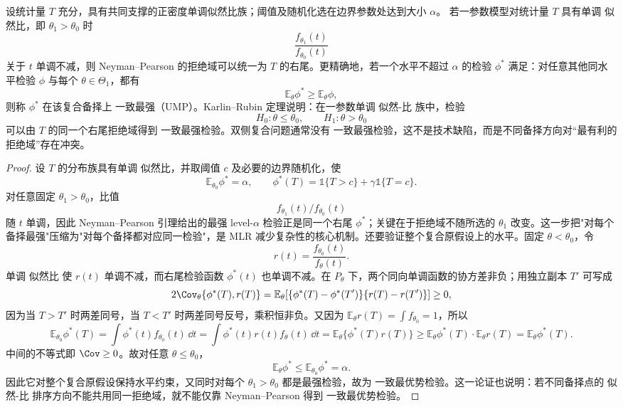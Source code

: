 \begin{theorem}[单调似然比与一致最强检验]
设统计量 $T$ 充分，具有共同支撑的正密度单调似然比族；阈值及随机化选在边界参数处达到大小 $\alpha$。
若一参数模型对统计量 $T$ 具有单调 似然比，即 $\theta_1>\theta_0$ 时
\[
 \frac{f_{\theta_1}(t)}{f_{\theta_0}(t)}
\]
关于 $t$ 单调不减，则 Neyman--Pearson 的拒绝域可以统一为 $T$ 的右尾。更精确地，若一个水平不超过 $\alpha$ 的检验 $\phi^*$ 满足：对任意其他同水平检验 $\phi$ 与每个 $\theta\in\Theta_1$，都有
\[
 \mathbb E_\theta\phi^*\ge\mathbb E_\theta\phi,
\]
则称 $\phi^*$ 在该复合备择上 一致最强（UMP）。Karlin--Rubin 定理说明：在一参数单调 似然-比 族中，检验
\[
 H_0:\theta\le\theta_0,
 \qquad
 H_1:\theta>\theta_0
\]
可以由 $T$ 的同一个右尾拒绝域得到 一致最强检验。双侧复合问题通常没有 一致最强检验，这不是技术缺陷，而是不同备择方向对“最有利的拒绝域”存在冲突。
\end{theorem}

\begin{proof}
设 $T$ 的分布族具有单调 似然比，并取阈值 $c$ 及必要的边界随机化，使
\[
 \mathbb E_{\theta_0}\phi^*=\alpha,
 \qquad
 \phi^*(T)=\mathds{1}\{T>c\}+\gamma\mathds{1}\{T=c\}.
\]
对任意固定 $\theta_1>\theta_0$，比值
\[
 f_{\theta_1}(t)/f_{\theta_0}(t)
\]
随 $t$ 单调，因此 Neyman--Pearson 引理给出的最强 level-$\alpha$ 检验正是同一个右尾 $\phi^*$；关键在于拒绝域不随所选的 $\theta_1$ 改变。这一步把"对每个备择最强"压缩为"对每个备择都对应同一检验"，是 MLR 减少复杂性的核心机制。还要验证整个复合原假设上的水平。固定 $\theta<\theta_0$，令
\[
 r(t)=\frac{f_{\theta_0}(t)}{f_\theta(t)}.
\]
单调 似然比 使 $r(t)$ 单调不减，而右尾检验函数 $\phi^*(t)$ 也单调不减。在 $P_\theta$ 下，两个同向单调函数的协方差非负；用独立副本 $T'$ 可写成
\[
 2\Cov_\theta\{\phi^*(T),r(T)\}
 =\mathbb E_\theta\!\left[
 \{\phi^*(T)-\phi^*(T')\}
 \{r(T)-r(T')\}
 \right]\ge0,
\]
因为当 $T>T'$ 时两差同号，当 $T<T'$ 时两差同号反号，乘积恒非负。又因为 $\mathbb E_\theta r(T)=\int f_{\theta_0}=1$，所以
\[
 \mathbb E_{\theta_0}\phi^*(T)
 =\int\phi^*(t)f_{\theta_0}(t)\,\dd t
 =\int\phi^*(t)r(t)f_\theta(t)\,\dd t
 =\mathbb E_\theta\{\phi^*(T)r(T)\}
 \ge\mathbb E_\theta\phi^*(T)\cdot\mathbb E_\theta r(T)
 =\mathbb E_\theta\phi^*(T).
\]
中间的不等式即 $\Cov\ge0$。故对任意 $\theta\le\theta_0$，
\[
 \mathbb E_\theta\phi^*
 \le\mathbb E_{\theta_0}\phi^*=\alpha.
\]
因此它对整个复合原假设保持水平约束，又同时对每个 $\theta_1>\theta_0$ 都是最强检验，故为 一致最优势检验。这一论证也说明：若不同备择点的 似然-比 排序方向不能共用同一拒绝域，就不能仅靠 Neyman--Pearson 得到 一致最优势检验。
\end{proof}


